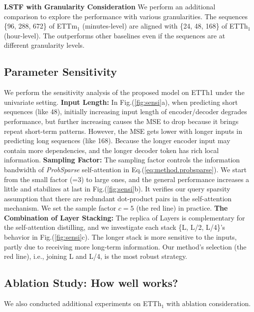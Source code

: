 \textbf{LSTF with Granularity Consideration}
We perform an additional comparison to explore the performance with various granularities. The sequences \{96, 288, 672\} of ETTm$_1$ (minutes-level) are aligned with \{24, 48, 168\} of ETTh$_1$ (hour-level). The {\mn} outperforms other baselines even if the sequences are at different granularity levels.

\subsection{Parameter Sensitivity}
We perform the sensitivity analysis of the proposed {\mn} model on ETTh1 under the univariate setting.
\textbf{Input Length:} In Fig.(\ref{fig:sensi}a), when predicting short sequences (like 48), initially increasing input length of encoder/decoder degrades performance, but further increasing causes the MSE to drop because it brings repeat short-term patterns. However, the MSE gets lower with longer inputs in predicting long sequences (like 168). Because the longer encoder input may contain more dependencies, and the longer decoder token has rich local information.
\textbf{Sampling Factor:} The sampling factor controls the information bandwidth of \emph{ProbSparse} self-attention in Eq.(\ref{eq:method.probsparse}). We start from the small factor (=3) to large ones, and the general performance increases a little and stabilizes at last in Fig.(\ref{fig:sensi}b). It verifies our query sparsity assumption that there are redundant dot-product pairs in the self-attention mechanism. We set the sample factor $c=5$ (the red line) in practice.
\textbf{The Combination of Layer Stacking:} The replica of Layers is complementary for the self-attention distilling, and we investigate each stack \{L, L/2, L/4\}'s behavior in Fig.(\ref{fig:sensi}c). The longer stack is more sensitive to the inputs, partly due to receiving more long-term information. Our method's selection (the red line), i.e., joining L and L/4, is the most robust strategy.

\subsection{Ablation Study: How well {\mn} works?}
We also conducted additional experiments on ETTh$_1$ with ablation consideration.

